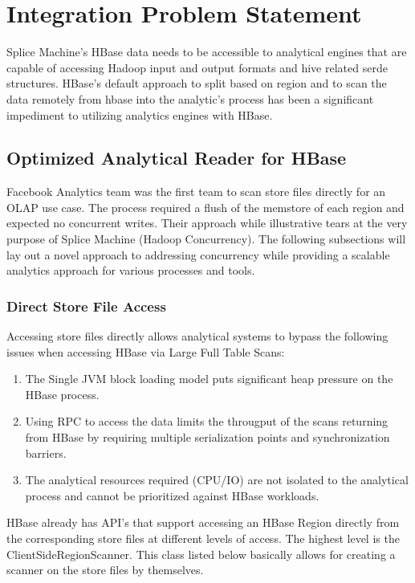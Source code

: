 \section{Integration Problem Statement}
Splice Machine's HBase data needs to be accessible to analytical engines that are capable of accessing
Hadoop input and output formats and hive related serde structures.  HBase's
default approach to split based on region and to scan the data remotely from
hbase into the analytic's process has been a significant impediment to utilizing
analytics engines with HBase.

\subsection{Optimized Analytical Reader for HBase}
Facebook Analytics team was the first team to scan store files directly for an
OLAP use case.  The process required a flush of the memstore of each region and
expected no concurrent writes.  Their approach while illustrative tears at the
very purpose of Splice Machine (Hadoop Concurrency).  The following subsections
will lay out a novel approach to addressing concurrency while providing a
scalable analytics approach for various processes and tools.

\subsubsection{Direct Store File Access}
Accessing store files directly allows analytical systems to bypass the following
issues when accessing HBase via Large Full Table Scans:

\begin{enumerate}
	\item The Single JVM block loading model puts significant heap pressure on the
	HBase process.
	\item Using RPC to access the data limits the througput of the scans returning
	from HBase by requiring multiple serialization points and 
	synchronization barriers.
	\item The analytical resources required (CPU/IO) are not isolated to the
	analytical process and cannot be prioritized against HBase workloads.
\end{enumerate}


HBase already has API's that support accessing an HBase Region
directly from the corresponding store files at different levels of access.  The
highest level is the ClientSideRegionScanner.  This class listed below basically
allows for creating a scanner on the store files by themselves.

